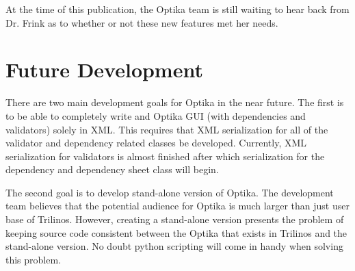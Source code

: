 At the time of this publication, the Optika team is still waiting to hear back from Dr. Frink as to whether or not these new features met her needs.

\section{Future Development}
There are two main development goals for Optika in the near future. The first is to be able to completely write and Optika GUI (with dependencies and validators)
solely in XML. This requires that XML serialization for all of the validator and dependency related classes be developed. Currently,
XML serialization for validators is almost finished after which serialization for the dependency and dependency sheet class will begin.

The second goal is to develop stand-alone version of Optika. The development team believes that the potential audience for Optika is much 
larger than just user base of Trilinos. However, creating a stand-alone version presents the problem of keeping source code consistent between
the Optika that exists in Trilinos and the stand-alone version. No doubt python scripting will come in handy when solving this problem.


	



	

